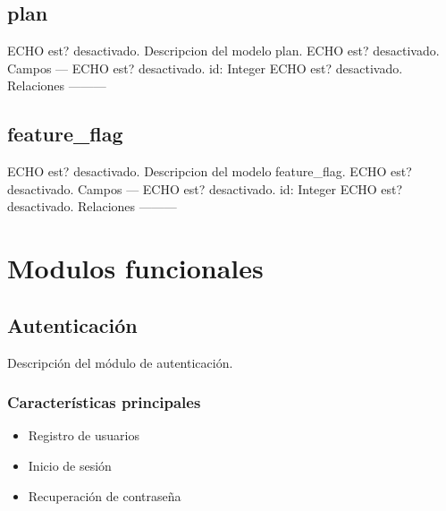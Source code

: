 \documentclass[letterpaper,10pt,spanish]{sphinxmanual}
\begin{document}
\sphinxstepscope


\subsection{plan}
\label{\detokenize{modelos/plan:plan}}\label{\detokenize{modelos/plan::doc}}
\sphinxAtStartPar
ECHO est? desactivado.
Descripcion del modelo plan.
ECHO est? desactivado.
Campos
—\textendash{}
ECHO est? desactivado.
\sphinxhyphen{} id: Integer
ECHO est? desactivado.
Relaciones
———\sphinxhyphen{}

\sphinxstepscope


\subsection{feature\_flag}
\label{\detokenize{modelos/feature_flag:feature-flag}}\label{\detokenize{modelos/feature_flag::doc}}
\sphinxAtStartPar
ECHO est? desactivado.
Descripcion del modelo feature\_flag.
ECHO est? desactivado.
Campos
—\textendash{}
ECHO est? desactivado.
\sphinxhyphen{} id: Integer
ECHO est? desactivado.
Relaciones
———\sphinxhyphen{}

\sphinxstepscope


\section{Modulos funcionales}
\label{\detokenize{modulos/index:modulos-funcionales}}\label{\detokenize{modulos/index::doc}}
\sphinxstepscope


\subsection{Autenticación}
\label{\detokenize{modulos/autenticacion:autenticacion}}\label{\detokenize{modulos/autenticacion::doc}}
\sphinxAtStartPar
Descripción del módulo de autenticación.


\subsubsection{Características principales}
\label{\detokenize{modulos/autenticacion:caracteristicas-principales}}\begin{itemize}
\item {} 
\sphinxAtStartPar
Registro de usuarios

\item {} 
\sphinxAtStartPar
Inicio de sesión

\item {} 
\sphinxAtStartPar
Recuperación de contraseña

\end{itemize}
\end{document}
